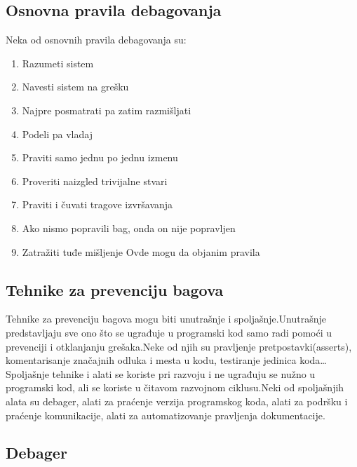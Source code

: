 \documentclass[a4paper]{article}
\begin{document}
\subsection{Osnovna pravila debagovanja}
\label{subsec:podnaslovN}

Neka od osnovnih pravila debagovanja su\cite{debagovanje_vladaf}:
\begin{enumerate}
	\item Razumeti sistem
	\item Navesti sistem na grešku
	\item Najpre posmatrati pa zatim razmišljati
	\item Podeli pa vladaj
	\item Praviti samo jednu po jednu izmenu
	\item Proveriti naizgled trivijalne stvari
	\item Praviti i čuvati tragove izvršavanja
	\item Ako nismo popravili bag, onda on nije popravljen
	\item Zatražiti tuđe mišljenje
	Ovde mogu da objanim pravila
\end{enumerate}

\subsection{Tehnike za prevenciju bagova}
\label{subsec:Tehnike za prevenciju bagova}

Tehnike za prevenciju bagova mogu biti unutrašnje i spoljašnje.Unutrašnje predstavljaju sve ono što se ugrađuje u programski kod samo radi pomoći u prevenciji i otklanjanju grešaka.Neke od njih su pravljenje pretpostavki(asserts), komentarisanje značajnih odluka i mesta u kodu, testiranje jedinica koda…Spoljašnje tehnike i alati se koriste pri razvoju i ne ugrađuju se nužno u programski kod, ali se koriste u čitavom razvojnom ciklusu.Neki od spoljašnjih alata su debager, alati za praćenje verzija programskog koda, alati za podršku i praćenje komunikacije, alati za automatizovanje pravljenja dokumentacije\cite{debagovanje_vladaf}.

\subsection{Debager}
\label{subsec:Debager}
\end{document}
